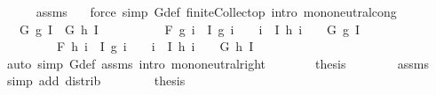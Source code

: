 \begin{isabellebody}
\ \ \ \ \isamarkupfalse%
\ assms\ \ \isamarkupfalse%
\ {\isacharparenleft}{\kern0pt}force\ simp{\isacharcolon}{\kern0pt}\ G{\isacharunderscore}{\kern0pt}def\ finite{\isacharunderscore}{\kern0pt}Collect{\isacharunderscore}{\kern0pt}op\ intro{\isacharbang}{\kern0pt}{\isacharcolon}{\kern0pt}\ mono{\isacharunderscore}{\kern0pt}neutral{\isacharunderscore}{\kern0pt}cong{\isacharparenright}{\kern0pt}\isanewline
\ \ \isamarkupfalse%
\ \isamarkupfalse%
\ {\isachardoublequoteopen}{\isasymdots}\ {\isacharequal}{\kern0pt}\ G\ g\ I\ \isactrlbold {\isacharasterisk}{\kern0pt}\ G\ h\ I{\isachardoublequoteclose}\isanewline
\ \ \isamarkupfalse%
\ {\isacharminus}{\kern0pt}\isanewline
\ \ \ \ \isamarkupfalse%
\ {\isachardoublequoteopen}F\ g\ {\isacharparenleft}{\kern0pt}{\isacharbraceleft}{\kern0pt}i\ {\isasymin}\ I{\isachardot}{\kern0pt}\ g\ i\ {\isasymnoteq}\ \ {\isasymunion}\ {\isacharbraceleft}{\kern0pt}i\ {\isasymin}\ I{\isachardot}{\kern0pt}\ h\ i\ {\isasymnoteq}\ \ {\isacharequal}{\kern0pt}\ G\ g\ I{\isachardoublequoteclose}\isanewline
\ \ \ \ \ \ \ \ \ {\isachardoublequoteopen}F\ h\ {\isacharparenleft}{\kern0pt}{\isacharbraceleft}{\kern0pt}i\ {\isasymin}\ I{\isachardot}{\kern0pt}\ g\ i\ {\isasymnoteq}\ \ {\isasymunion}\ {\isacharbraceleft}{\kern0pt}i\ {\isasymin}\ I{\isachardot}{\kern0pt}\ h\ i\ {\isasymnoteq}\ \ {\isacharequal}{\kern0pt}\ G\ h\ I{\isachardoublequoteclose}\isanewline
\ \ \ \ \ \ \isamarkupfalse%
\ {\isacharparenleft}{\kern0pt}auto\ simp{\isacharcolon}{\kern0pt}\ G{\isacharunderscore}{\kern0pt}def\ assms\ intro{\isacharcolon}{\kern0pt}\ mono{\isacharunderscore}{\kern0pt}neutral{\isacharunderscore}{\kern0pt}right{\isacharparenright}{\kern0pt}\isanewline
\ \ \ \ \isamarkupfalse%
\ \isamarkupfalse%
\ {\isacharquery}{\kern0pt}thesis\isanewline
\ \ \ \ \ \ \isamarkupfalse%
\ assms\ \isamarkupfalse%
\ {\isacharparenleft}{\kern0pt}simp\ add{\isacharcolon}{\kern0pt}\ distrib{\isacharparenright}{\kern0pt}\isanewline
\ \ \isamarkupfalse%
\isanewline
\ \ \isamarkupfalse%
\ \isamarkupfalse%
\ {\isacharquery}{\kern0pt}thesis\ \isacommand{{\isachardot}{\kern0pt}}\isamarkupfalse%

\end{isabellebody}
